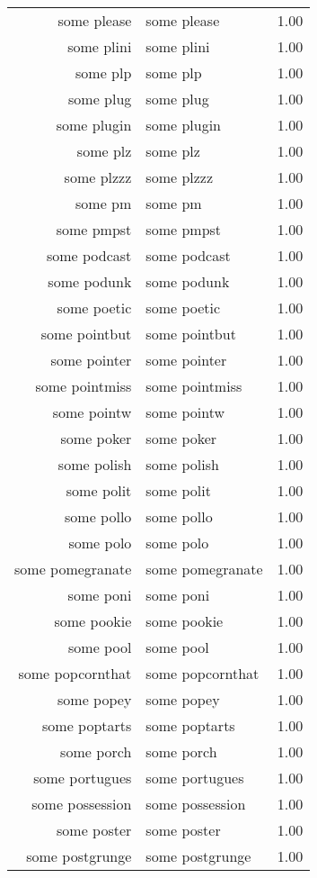 \begin{table}[ht]
\begin{tabular}{rlr}
  some please & some please & 1.00 \\ 
  some plini & some plini & 1.00 \\ 
  some plp & some plp & 1.00 \\ 
  some plug & some plug & 1.00 \\ 
  some plugin & some plugin & 1.00 \\ 
  some plz & some plz & 1.00 \\ 
  some plzzz & some plzzz & 1.00 \\ 
  some pm & some pm & 1.00 \\ 
  some pmpst & some pmpst & 1.00 \\ 
  some podcast & some podcast & 1.00 \\ 
  some podunk & some podunk & 1.00 \\ 
  some poetic & some poetic & 1.00 \\ 
  some pointbut & some pointbut & 1.00 \\ 
  some pointer & some pointer & 1.00 \\ 
  some pointmiss & some pointmiss & 1.00 \\ 
  some pointw & some pointw & 1.00 \\ 
  some poker & some poker & 1.00 \\ 
  some polish & some polish & 1.00 \\ 
  some polit & some polit & 1.00 \\ 
  some pollo & some pollo & 1.00 \\ 
  some polo & some polo & 1.00 \\ 
  some pomegranate & some pomegranate & 1.00 \\ 
  some poni & some poni & 1.00 \\ 
  some pookie & some pookie & 1.00 \\ 
  some pool & some pool & 1.00 \\ 
  some popcornthat & some popcornthat & 1.00 \\ 
  some popey & some popey & 1.00 \\ 
  some poptarts & some poptarts & 1.00 \\ 
  some porch & some porch & 1.00 \\ 
  some portugues & some portugues & 1.00 \\ 
  some possession & some possession & 1.00 \\ 
  some poster & some poster & 1.00 \\ 
  some postgrunge & some postgrunge & 1.00 \\ 

\end{tabular}
\end{table}
